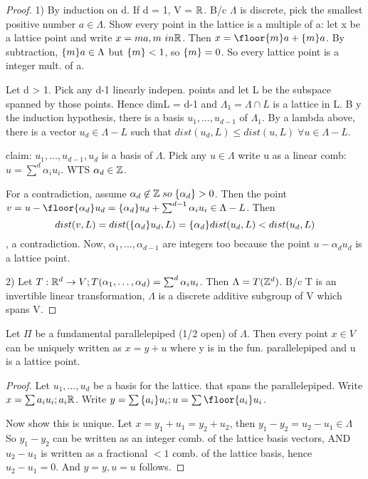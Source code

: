 \begin{proof}
1) By induction on d. If d = 1, V = $\mathbb R$. B/c $\Lambda$ is discrete, pick the smallest positive number  $a \in \Lambda$. Show every point in the lattice is a multiple of a: let x be a lattice point and write $x = ma, m\ in \mathbb R$. Then $x = \floor{m}a + \floorc{m}a$. By subtraction, ${\left \lbrace m \right \rbrace}a \in \Lambda$ but ${\left \lbrace m \right \rbrace}  < 1$, so ${\left \lbrace m \right \rbrace} = 0$. So every lattice point is a integer mult. of a.

Let d > 1. Pick any d-1 linearly indepen. points and let L be the subspace spanned by those points. Hence dimL = d-1 and $\Lambda_1 = \Lambda \cap L$ is a lattice in L. B y the induction hypothesis, there is a basis $u_1, \dots, u_{d-1}$ of $\Lambda_1$. By a lambda above, there is a vector $u_d \in \Lambda -L$ such that $dist(u_d, L) \leq dist(u,L) \; \forall u \in \Lambda -L$.

claim: $u_1, \dots, u_{d-1}, u_d$ is a basis of $\Lambda$. Pick any $u \in \Lambda$ write u as a linear comb: $u = \sum^d \alpha_i u_i$. WTS $\alpha_d \in \mathbb Z$. 

For a contradiction, assume $\alpha_d \not \in \mathbb Z \; so \; {\left \lbrace \alpha_d \right \rbrace} > 0$. Then the point $v = u - \floor{\alpha_d} u_d  = \floorc{\alpha_d}u_d + \sum^{d-1} \alpha_i u_i \in \Lambda - L$. Then
\begin{displaymath}
	dist(v, L) = dist({\left \lbrace \alpha_d \right \rbrace}u_d, L) = {\left \lbrace \alpha_d \right \rbrace}dist(u_d, L) < dist(u_d, L)
\end{displaymath}, a contradiction. Now, $\alpha_1, \dots, \alpha_{d-1}$ are integers too because the point $u - \alpha_d u_d$ is a lattice point.


2) Let $T: \mathbb R^d \to V; T(\alpha_1, \dots, \alpha_d) = \sum^d \alpha_i u_i$. Then $\Lambda = T(\mathbb Z^d)$. B/c T is an invertible linear transformation, $\Lambda$ is a discrete additive subgroup of V which spans V.
\end{proof}


\begin{lemma}
\label{latticeParallelepiped}
	Let $\Pi$ be a fundamental parallelepiped (1/2 open) of $\Lambda$. Then every point $x \in V$ can be uniquely written as $x =  y + u$ where y is in the fun. parallelepiped and u is a lattice point.
\end{lemma}
\begin{proof}
Let $u_1, \dots, u_d$ be a basis for the lattice. that spans the parallelepiped. Write $x = \sum a_i u_i; a_i \mathbb R$. Write $y = \sum \floorc{a_i}u_i; u = \sum \floor{a_i}u_i$.

Now show this is unique. Let $x = y_1 + u_1 = y_2 + u_2$, then $y_1 - y_2 = u_2 - u_1 \in \Lambda$ So $y_1 - y_2$ can be written as an integer comb. of the lattice basis vectors, AND $u_2 - u_1$ is written as a fractional $< 1$ comb. of the lattice basis, hence $u_2 - u_1 = 0$. And $y =y, u=u$ follows.

\end{proof}



